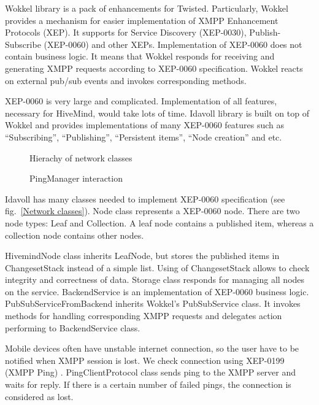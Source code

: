 Wokkel library is a pack of enhancements for Twisted. Particularly, Wokkel
provides a mechanism for easier implementation of XMPP Enhancement Protocols
(XEP). It supports for Service Discovery (XEP-0030), Publish-Subscribe
(XEP-0060) and other XEPs. Implementation of XEP-0060 does not contain business
logic. It means that Wokkel responds for receiving and generating XMPP requests
according to XEP-0060 specification. Wokkel reacts on external pub/sub events
and invokes corresponding methods.

XEP-0060 is very large and complicated. Implementation of all features,
necessary for HiveMind, would take lots of time. Idavoll library is built on top
of Wokkel and provides implementations of many XEP-0060 features such as
``Subscribing'', ``Publishing'', ``Persistent items'', ``Node creation'' and
etc.

\begin{figure}
\begin{minipage}[t]{0.65\linewidth}
  \caption{Hierachy of network classes}
  \label{Network classes}
\end{minipage}
\hfill
\begin{minipage}[t]{0.35\linewidth}
  \caption{PingManager interaction}
  \label{Ping manager}
\end{minipage}
\end{figure}

Idavoll has many classes needed to implement XEP-0060 specification (see
fig.~\ref{Network classes}). Node class represents a XEP-0060 node. There are
two node types: Leaf and Collection. A leaf node contains a published item,
whereas a collection node contains other nodes.

HivemindNode class inherits LeafNode, but stores the published items in
ChangesetStack instead of a simple list. Using of ChangesetStack allows to check
integrity and correctness of data. Storage class responds for managing all nodes
on the service. BackendService is an implementation of XEP-0060 business logic.
PubSubServiceFromBackend inherits Wokkel's PubSubService class. It invokes
methods for handling corresponding XMPP requests and delegates action performing
to BackendService class.

Mobile devices often have unstable internet connection, so the user have to be
notified when XMPP session is lost. We check connection using XEP-0199 (XMPP
Ping) \cite{ping-xep-0199}. PingClientProtocol class sends ping to the XMPP
server and waits for reply. If there is a certain number of failed pings, the
connection is considered as lost.

